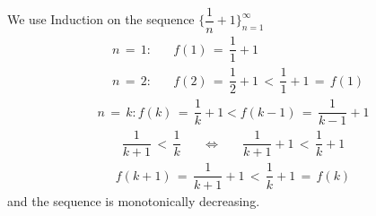 \begin{example}
We use Induction on the sequence $\Big\{\dfrac{1}{n} + 1\Big\}_{n=1}^{\infty}$
\begin{align*}
    &n \hspace{2pt} = \hspace{2pt} 1: \hspace{20pt} f(1) \hspace{2pt} = \hspace{2pt} \dfrac{1}{1} + 1\\[2ex]
    &n \hspace{2pt} = \hspace{2pt} 2: \hspace{20pt} f(2) \hspace{2pt} = \hspace{2pt} \dfrac{1}{2} + 1 \hspace{2pt} < \hspace{2pt} \dfrac{1}{1} + 1 \hspace{2pt} = \hspace{2pt} f(1)
\end{align*}
\begin{align*}    
    n \hspace{2pt} = \hspace{2pt} k: f(k) \hspace{2pt} = \hspace{2pt} \dfrac{1}{k} + 1 < f(k-1) \hspace{2pt} = \hspace{2pt} \dfrac{1}{k-1} + 1
\end{align*}
\begin{align*}
    \dfrac{1}{k+1} \hspace{2pt} < \hspace{2pt} \dfrac{1}{k} \hspace{20pt} \Longleftrightarrow \hspace{20pt} \dfrac{1}{k+1} + 1 \hspace{2pt} < \hspace{2pt} \dfrac{1}{k} + 1
\end{align*}
\begin{align*}
    f(k+1) \hspace{2pt} = \hspace{2pt} \dfrac{1}{k+1} + 1 \hspace{2pt} < \hspace{2pt} \dfrac{1}{k} + 1 \hspace{2pt} = \hspace{2pt} f(k)
\end{align*}
and the sequence is monotonically decreasing.
\end{example}

